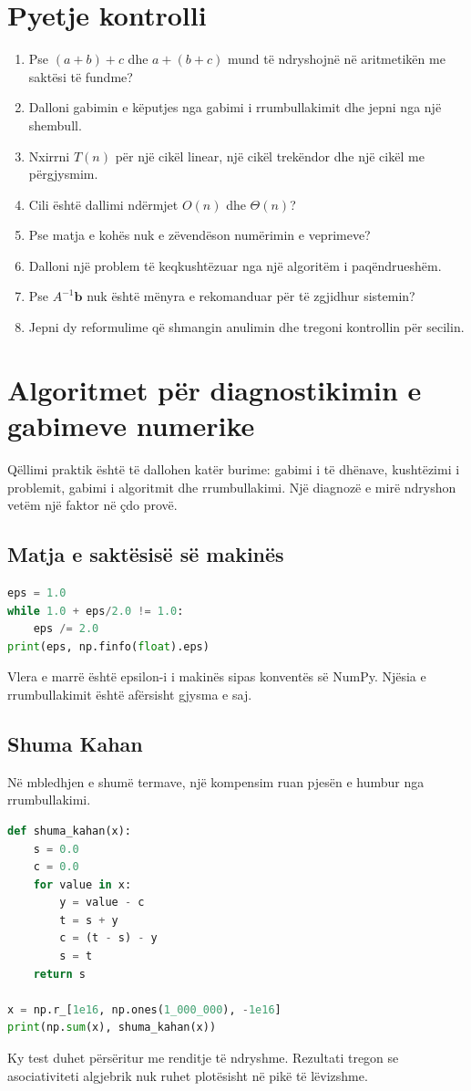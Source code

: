 \documentclass[11pt,oneside,openany]{book}
\newcommand{\vect}[1]{\bm{#1}}
\begin{document}
\section*{Pyetje kontrolli}
\begin{enumerate}
\item Pse $(a+b)+c$ dhe $a+(b+c)$ mund të ndryshojnë në aritmetikën me saktësi të fundme?
\item Dalloni gabimin e këputjes nga gabimi i rrumbullakimit dhe jepni nga një shembull.
\item Nxirrni $T(n)$ për një cikël linear, një cikël trekëndor dhe një cikël me përgjysmim.
\item Cili është dallimi ndërmjet $O(n)$ dhe $\Theta(n)$?
\item Pse matja e kohës nuk e zëvendëson numërimin e veprimeve?
\item Dalloni një problem të keqkushtëzuar nga një algoritëm i paqëndrueshëm.
\item Pse $A^{-1}\vect b$ nuk është mënyra e rekomanduar për të zgjidhur sistemin?
\item Jepni dy reformulime që shmangin anulimin dhe tregoni kontrollin për secilin.
\end{enumerate}

\section{Algoritmet për diagnostikimin e gabimeve numerike}
Qëllimi praktik është të dallohen katër burime: gabimi i të dhënave, kushtëzimi i problemit, gabimi i algoritmit dhe rrumbullakimi. Një diagnozë e mirë ndryshon vetëm një faktor në çdo provë.

\subsection{Matja e saktësisë së makinës}
\begin{lstlisting}[language=Python,caption={Vlerësimi empirik i distancës pranë njësisë.}]
eps = 1.0
while 1.0 + eps/2.0 != 1.0:
    eps /= 2.0
print(eps, np.finfo(float).eps)
\end{lstlisting}
Vlera e marrë është epsilon-i i makinës sipas konventës së NumPy. Njësia e rrumbullakimit është afërsisht gjysma e saj.

\subsection{Shuma Kahan}
Në mbledhjen e shumë termave, një kompensim ruan pjesën e humbur nga rrumbullakimi.
\begin{lstlisting}[language=Python,caption={Mbledhja e kompensuar Kahan.}]
def shuma_kahan(x):
    s = 0.0
    c = 0.0
    for value in x:
        y = value - c
        t = s + y
        c = (t - s) - y
        s = t
    return s

x = np.r_[1e16, np.ones(1_000_000), -1e16]
print(np.sum(x), shuma_kahan(x))
\end{lstlisting}
Ky test duhet përsëritur me renditje të ndryshme. Rezultati tregon se asociativiteti algjebrik nuk ruhet plotësisht në pikë të lëvizshme.
\end{document}
